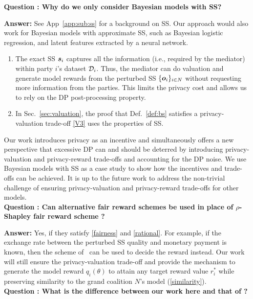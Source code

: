 \documentclass{article}
\theoremstyle{plain}
\theoremstyle{definition}
\theoremstyle{remark}
\renewcommand{\citet}[1]{\cite{#1}}
\begin{document}
\textbf{Question : Why do we only consider Bayesian models with SS?}

\textbf{Answer:} See App~\ref{app:sub:ss} for a background on SS. Our approach would also work for Bayesian models with approximate SS, such as Bayesian logistic regression, and latent features extracted by a neural network.

\begin{enumerate}
\item The exact SS ${\bm{s}}_i$ captures all the information (i.e., required by the mediator) within party $i$'s dataset ${\mathcal{D}}_i$. Thus, the mediator can do valuation and generate model rewards from the perturbed SS $\{{\bm{o}}_i\}_{i \in N}$ without requesting more information from the parties. This limits the privacy cost and allows us to rely on the DP post-processing property.
\item  In Sec.~\ref{sec:valuation}, the proof that Def.~\ref{def:bs} satisfies a privacy-valuation trade-off \eqref{V3} uses the properties of SS.
\end{enumerate}

Our work introduces privacy as an incentive and simultaneously offers a new perspective that excessive DP can and should be deterred by introducing  privacy-valuation and privacy-reward trade-offs and accounting for the DP noise.
We use Bayesian models with SS as a case study to show how the incentives and trade-offs can be achieved.
It is up to the future work to address the non-trivial challenge of ensuring  privacy-valuation and privacy-reward trade-offs for other models.\\

\textbf{Question : Can alternative fair reward schemes be used in place of $\rho$-Shapley fair reward scheme \cite{simcollaborative}?}

\textbf{Answer:} Yes, if they satisfy \ref{fairness} and \ref{rational}. For example, if the exchange rate between the perturbed SS quality and monetary payment is known, then the scheme of~\citet{nguyen22trade} can be used to decide the reward instead.
Our work will still ensure the privacy-valuation trade-off and provide the mechanism to generate the model reward $q_i(\theta)$ to attain any target reward value $r^*_i$ while preserving similarity to the grand coalition $N$'s model (\ref{similarity}).\\

\textbf{Question : What is the difference between our work here and that of \citet{simcollaborative}?}
\end{document}
